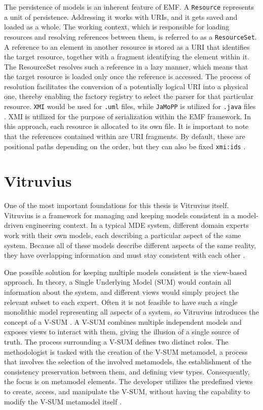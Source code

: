 The persistence of models is an inherent feature of EMF.
A \texttt{Resource} represents a unit of persistence.
Addressing it works with URIs, and it gets saved and loaded as a whole.
The working context, which is responsible for loading resources and resolving references between them, is referred to as a \texttt{ResourceSet}.
A reference to an element in another resource is stored as a URI that identifies the target resource, together with a fragment identifying the element within it.
The ResourceSet resolves such a reference in a lazy manner, which means that the target resource is loaded only once the reference is accessed.
The process of resolution facilitates the conversion of a potentially logical URI into a physical one, thereby enabling the factory registry to select the parser for that particular resource.
\texttt{XMI} would be used for \texttt{.uml} files, while \texttt{JaMoPP} is utilized for \texttt{.java} files \cite{emfDocs,heidenreich2009closing}.
XMI is utilized for the purpose of serialization within the EMF framework.
In this approach, each resource is allocated to its own file.
It is important to note that the references contained within are URI fragments.
By default, these are positional paths depending on the order, but they can also be fixed \texttt{xmi:ids} \cite{omgXmi,emfDocs}.

\section{Vitruvius}
\label{sec:Foundations:Vitruvius}

One of the most important foundations for this thesis is Vitruvius itself.
Vitruvius is a framework for managing and keeping models consistent in a model-driven engineering context.
In a typical MDE system, different domain experts work with their own models, each describing a particular aspect of the same system.
Because all of these models describe different aspects of the same reality, they have overlapping information and must stay consistent with each other \cite{KLARE2021110815}.

One possible solution for keeping multiple models consistent is the view-based approach.
In theory, a Single Underlying Model (SUM) would contain all information about the system, and different views would simply project the relevant subset to each expert.
Often it is not feasible to have such a single monolithic model representing all aspects of a system, so Vitruvius introduces the concept of a V-SUM \cite{amrani2024survey,hermann2024towards}.
A V-SUM combines multiple independent models and exposes views to interact with them, giving the illusion of a single source of truth.
The process surrounding a V-SUM defines two distinct roles.
The methodologist is tasked with the creation of the V-SUM metamodel, a process that involves the selection of the involved metamodels, the establishment of the consistency preservation between them, and defining view types.
Consequently, the focus is on metamodel elements.
The developer utilizes the predefined views to create, access, and manipulate the V-SUM, without having the capability to modify the V-SUM metamodel itself \cite{KLARE2021110815}.

